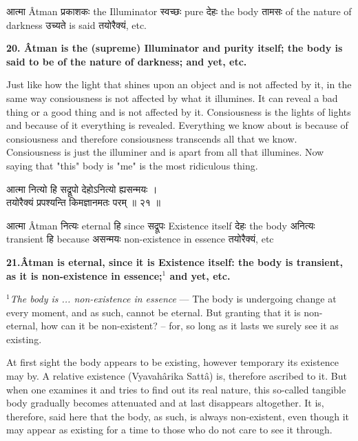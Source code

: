\documentclass{article}
\begin{document}
\texthindi{आत्मा}
Âtman
\texthindi{प्रकाशकः}
the Illuminator
\texthindi{स्वच्छः}
pure
\texthindi{देहः}
the body
\texthindi{तामसः}
of the nature of darkness
\texthindi{उच्यते}
is said
\texthindi{तयोरैक्यं,}
etc.

\bigskip

\textbf{20. Âtman is the (supreme) Illuminator and purity itself; the body is
said to be of the nature of darkness; and yet, etc.}

\begin{oframed}

    Just like how the light that shines upon an object and is not affected by
    it, in the same way consiousness is not affected by what it illumines. It
    can reveal a bad thing or a good thing and is not affected by it.
    Consiousness is the lights of lights and because of it everything is
    revealed. Everything we know about is because of consiousness and therefore
    consiousness transcends all that we know. Consiousness is just the
    illuminer and is apart from all that illumines. Now saying that "this"
    body is "me" is the most ridiculous thing.

\end{oframed}

\begin{large}
\begin{center}
    \begin{hindi}
    आत्मा नित्यो हि सद्रूपो देहोऽनित्यो ह्यसन्मयः ।\\
    तयोरैक्यं प्रपश्यन्ति किमज्ञानमतः परम् ॥ २१ ॥
    \end{hindi}
\end{center}
\end{large}

\texthindi{आत्मा}
Âtman
\texthindi{नित्यः}
eternal
\texthindi{हि}
since
\texthindi{सद्रूपः}
Existence itself
\texthindi{देहः}
the body
\texthindi{अनित्यः}
transient
\texthindi{हि}
because
\texthindi{असन्मयः}
non-existence in essence
\texthindi{तयोरैक्यं,}
etc

\bigskip

\textbf{21.Âtman is eternal, since it is Existence itself: the body is
transient, as it is non-existence in essence;$^1$ and yet, etc.
}

{\small \textit{$^1$The body is ... non-existence in essence} --- The
body is undergoing change at every moment, and as such, cannot be eternal.
But granting that it is non-eternal, how can it be non-existent? -- for, so
long as it lasts we surely see it as existing.

At first sight the body appears to be existing, however temporary its existence
may by. A relative existence (Vyavahârika Sattâ) is, therefore ascribed to it.
But when one examines it and tries to find out its real nature, this so-called
tangible body gradually becomes attenuated and at last disappears altogether.
It is, therefore, said here that the body, as such, is always non-existent,
even though it may appear as existing for a time to those who do not care to
see it through.

}
\end{document}
